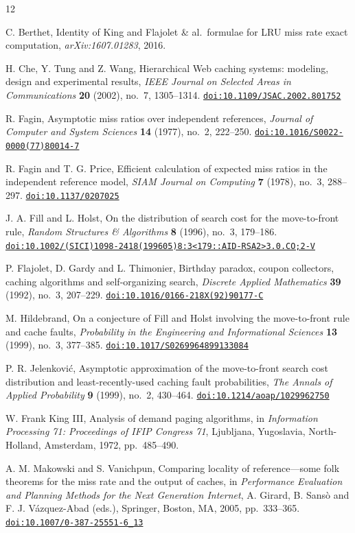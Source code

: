 \documentclass[11pt]{article}
\theoremstyle{remark}
\newcommand{\doi}[1]{\href{https://doi.org/#1}{\nolinkurl{doi:#1}}}
\begin{document}
\begin{thebibliography}{12}

C. Berthet,
Identity of King and Flajolet \& al.\ formulae for LRU miss rate exact computation,
\emph{arXiv:1607.01283}, 2016.

H. Che, Y. Tung and Z. Wang,
Hierarchical Web caching systems: modeling, design and experimental results,
\emph{IEEE Journal on Selected Areas in Communications} \textbf{20} (2002), no.~7, 1305--1314.
\doi{10.1109/JSAC.2002.801752}

R. Fagin,
Asymptotic miss ratios over independent references,
\emph{Journal of Computer and System Sciences} \textbf{14} (1977), no.~2, 222--250.
\doi{10.1016/S0022-0000(77)80014-7}

R. Fagin and T. G. Price,
Efficient calculation of expected miss ratios in the independent reference model,
\emph{SIAM Journal on Computing} \textbf{7} (1978), no.~3, 288--297.
\doi{10.1137/0207025}

J. A. Fill and L. Holst,
On the distribution of search cost for the move-to-front rule,
\emph{Random Structures \& Algorithms} \textbf{8} (1996), no.~3, 179--186.
\doi{10.1002/(SICI)1098-2418(199605)8:3<179::AID-RSA2>3.0.CO;2-V}

P. Flajolet, D. Gardy and L. Thimonier,
Birthday paradox, coupon collectors, caching algorithms and self-organizing search,
\emph{Discrete Applied Mathematics} \textbf{39} (1992), no.~3, 207--229.
\doi{10.1016/0166-218X(92)90177-C}

M. Hildebrand,
On a conjecture of Fill and Holst involving the move-to-front rule and cache faults,
\emph{Probability in the Engineering and Informational Sciences} \textbf{13} (1999), no.~3, 377--385.
\doi{10.1017/S0269964899133084}

P. R. Jelenkovi\'c,
Asymptotic approximation of the move-to-front search cost distribution and least-recently-used caching fault probabilities,
\emph{The Annals of Applied Probability} \textbf{9} (1999), no.~2, 430--464.
\doi{10.1214/aoap/1029962750}

W. Frank King III,
Analysis of demand paging algorithms,
in \emph{Information Processing 71: Proceedings of IFIP Congress 71},
Ljubljana, Yugoslavia, North-Holland, Amsterdam, 1972, pp.~485--490.

A. M. Makowski and S. Vanichpun,
Comparing locality of reference---some folk theorems for the miss rate and the output of caches,
in \emph{Performance Evaluation and Planning Methods for the Next Generation Internet},
A. Girard, B. Sans\`o and F. J. V\'azquez-Abad (eds.), Springer, Boston, MA, 2005, pp.~333--365.
\doi{10.1007/0-387-25551-6_13}


\end{thebibliography}
\end{document}
